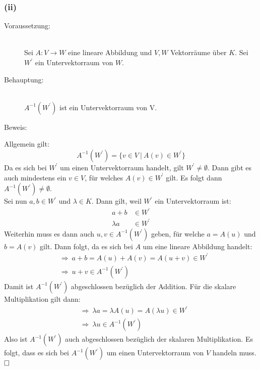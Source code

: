 \documentclass[10pt, a4paper]{article}
\begin{document}

		\subsubsection*{(ii)} %
		\label{ssub:ii}
		
			\begin{description}
				\item[Voraussetzung:] \hfill \\
					Sei $A:V\longrightarrow W$ eine lineare Abbildung und $V,W$ Vektorräume über $K$. Sei $W^\prime$ ein Untervektorraum von $W$.
				\item[Behauptung:] \hfill \\
					$A^{-1}(W^\prime)$ ist ein Untervektorraum von V.
				\item[Beweis:]
			\end{description}
			
			Allgemein gilt:
			\[
				A^{-1}(W^\prime) = \{ v\in V \ | \ A(v) \in W^\prime\}
			\]
			Da es sich bei $W^\prime$ um einen Untervektorraum handelt, gilt $W^\prime \neq \emptyset$. Dann gibt es auch mindestens ein $v \in V$, für welches $A(v)\in W^\prime$ gilt. Es folgt dann $A^{-1}(W^\prime) \neq \emptyset$.\\
			Sei nun $a,b \in W^\prime$ und $\lambda \in K$. Dann gilt, weil $W^\prime$ ein Untervektorraum ist:
			\begin{align*}
				a+b &\in W^\prime\\
				\lambda a &\in W^\prime
			\end{align*}
			Weiterhin muss es dann auch $u,v \in A^{-1}(W^\prime)$ geben, für welche $a = A(u)$ und $b = A(v)$ gilt. Dann folgt, da es sich bei $A$ um eine lineare Abbildung handelt:
			\begin{align*}
				&\Rightarrow \ a+b = A(u) + A(v) = A(u+v) \in W^\prime \\
				&\Rightarrow \ u+v \in A^{-1}(W^\prime)
			\end{align*}
			Damit ist $A^{-1}(W^\prime)$ abgeschlossen bezüglich der Addition. Für die skalare Multiplikation gilt dann:
			\begin{align*}
				&\Rightarrow \ \lambda a = \lambda A(u) = A(\lambda u) \in W^\prime \\
				&\Rightarrow \ \lambda u \in A^{-1}(W^\prime)
			\end{align*}
 			Also ist $A^{-1}(W^\prime)$ auch abgeschlossen bezüglich der skalaren Multiplikation. Es folgt, dass es sich bei $A^{-1}(W^\prime)$ um einen Untervektorraum von $V$ handeln muss. $\hfill\Box$


\end{document}
